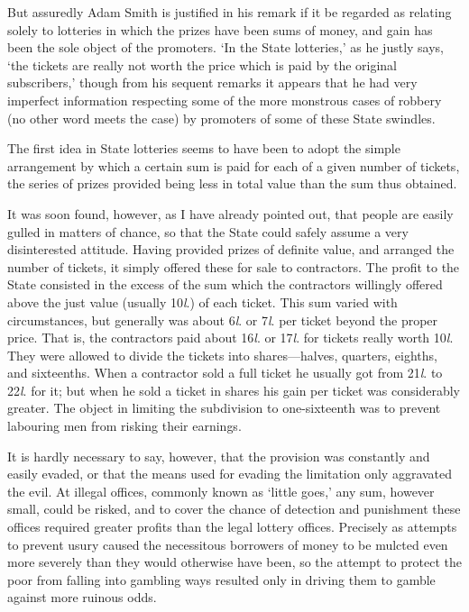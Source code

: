 \documentclass[letterpaper,12pt,oneside,openany]{memoir}
\begin{document}
But assuredly Adam Smith is justified in his remark
if it be regarded as relating solely to lotteries in which
the prizes have been sums of money, and gain has been
the sole object of the promoters. `In the State lotteries,'
as he justly says, `the tickets are really not worth
the price which is paid by the original subscribers,'
though from his sequent remarks it appears that he had
very imperfect information respecting some of the more
monstrous cases of robbery (no other word meets the
case) by promoters of some of these State swindles.

The first idea in State lotteries seems to have been
to adopt the simple arrangement by which a certain
sum is paid for each of a given number of tickets, the
series of prizes provided being less in total value than
the sum thus obtained.

It was soon found, however, as I have already
pointed out, that people are easily gulled in matters
of chance, so that the State could safely assume a
very disinterested attitude. Having provided prizes
of definite value, and arranged the number of tickets,
it simply offered these for sale to contractors. The
profit to the State consisted in the excess of the sum
which the contractors willingly offered above the just
value (usually 10\textit{l}.) of each ticket. This sum varied
with circumstances, but generally was about 6\textit{l}. or 7\textit{l}.
per ticket beyond the proper price. That is, the contractors
paid about 16\textit{l}. or 17\textit{l}. for tickets really worth
10\textit{l}. They were allowed to divide the tickets into
shares---halves, quarters, eighths, and sixteenths. When
a contractor sold a full ticket he usually got from
21\textit{l}. to 22\textit{l}. for it; but when he sold a ticket in shares
his gain per ticket was considerably greater. The
object in limiting the subdivision to one-sixteenth
was to prevent labouring men from risking their
earnings.

It is hardly necessary to say, however, that the
provision was constantly and easily evaded, or that
the means used for evading the limitation only aggravated
the evil. At illegal offices, commonly known as
`little goes,' any sum, however small, could be risked,
and to cover the chance of detection and punishment
these offices required greater profits than the legal
lottery offices. Precisely as attempts to prevent usury
caused the necessitous borrowers of money to be mulcted
even more severely than they would otherwise have
been, so the attempt to protect the poor from falling
into gambling ways resulted only in driving them to
gamble against more ruinous odds.
\end{document}

